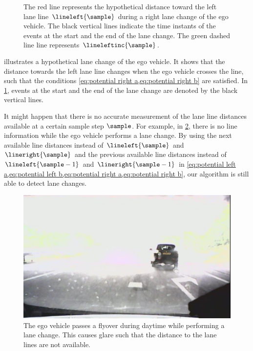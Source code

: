 \setlength{\figurewidth}{\linewidth}
\setlength{\figureheight}{0.6\linewidth}
\begin{figure}
	\centering
	
	\caption{\cstarta The red line represents the hypothetical distance toward the left lane line $\lineleft{\sample}$ during a right lane change of the ego vehicle. The black vertical lines indicate the time instants of the events at the start and the end of the lane change. The green dashed line line represents $\lineleftinc{\sample}$.\cenda}
	\label{fig:ego lane change}
\end{figure}

\cstarta
{} illustrates a hypothetical lane change of the ego vehicle. 
It shows that the distance towards the left lane line changes when the ego vehicle crosses the line, such that the conditions \cref{eq:potential right a,eq:potential right b} are satisfied. In \cref{fig:ego lane change}, events at the start and the end of the lane change are denoted by the black vertical lines.

\begin{remark}
	It might happen that there is no accurate measurement of the lane line distances available at a certain sample step $\sample$. For example, in \cref{fig:glare}, there is no line information while the ego vehicle performs a lane change. By using the next available line distances instead of $\lineleft{\sample}$ and $\lineright{\sample}$ and the previous available line distances instead of $\lineleft{\sample-1}$ and $\lineright{\sample-1}$ in \cref{eq:potential left a,eq:potential left b,eq:potential right a,eq:potential right b}, our algorithm is still able to detect lane changes.
\end{remark}
\cenda

\begin{figure}
	\centering
	\includegraphics[width=\linewidth]{figures/glare}
	\caption{\cstarta The ego vehicle passes a flyover during daytime while performing a lane change. This causes glare such that the distance to the lane lines are not available. 
	\cenda}
	\label{fig:glare}
\end{figure}



